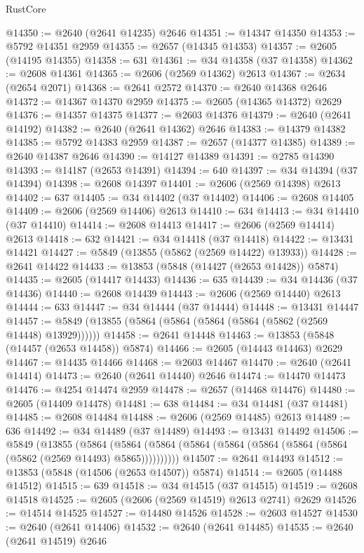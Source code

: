 \begin{lexlean}{RustCore}
\begin{coremodule}
@14350 := @2640 (@2641 @14235) @2646
@14351 := @14347 @14350
@14353 := @5792 @14351 @2959
@14355 := @2657 (@14345 @14353)
@14357 := @2605 (@14195 @14355)
@14358 := 631
@14361 := @34 @14358 (@37 @14358)
@14362 := @2608 @14361
@14365 := @2606 (@2569 @14362) @2613
@14367 := @2634 (@2654 @2071)
@14368 := @2641 @2572
@14370 := @2640 @14368 @2646
@14372 := @14367 @14370 @2959
@14375 := @2605 (@14365 @14372) @2629
@14376 := @14357 @14375
@14377 := @2603 @14376
@14379 := @2640 (@2641 @14192)
@14382 := @2640 (@2641 @14362) @2646
@14383 := @14379 @14382
@14385 := @5792 @14383 @2959
@14387 := @2657 (@14377 @14385)
@14389 := @2640 @14387 @2646
@14390 := @14127 @14389
@14391 := @2785 @14390
@14393 := @14187 (@2653 @14391)
@14394 := 640
@14397 := @34 @14394 (@37 @14394)
@14398 := @2608 @14397
@14401 := @2606 (@2569 @14398) @2613
@14402 := 637
@14405 := @34 @14402 (@37 @14402)
@14406 := @2608 @14405
@14409 := @2606 (@2569 @14406) @2613
@14410 := 634
@14413 := @34 @14410 (@37 @14410)
@14414 := @2608 @14413
@14417 := @2606 (@2569 @14414) @2613
@14418 := 632
@14421 := @34 @14418 (@37 @14418)
@14422 := @13431 @14421
@14427 := @5849 (@13855 (@5862 (@2569 @14422) @13933))
@14428 := @2641 @14422
@14433 := @13853 (@5848 (@14427 (@2653 @14428)) @5874)
@14435 := @2605 (@14417 @14433)
@14436 := 635
@14439 := @34 @14436 (@37 @14436)
@14440 := @2608 @14439
@14443 := @2606 (@2569 @14440) @2613
@14444 := 633
@14447 := @34 @14444 (@37 @14444)
@14448 := @13431 @14447
@14457 := @5849 (@13855 (@5864 (@5864 (@5864 (@5864 (@5862 (@2569 @14448) @13929))))))
@14458 := @2641 @14448
@14463 := @13853 (@5848 (@14457 (@2653 @14458)) @5874)
@14466 := @2605 (@14443 @14463) @2629
@14467 := @14435 @14466
@14468 := @2603 @14467
@14470 := @2640 (@2641 @14414)
@14473 := @2640 (@2641 @14440) @2646
@14474 := @14470 @14473
@14476 := @4254 @14474 @2959
@14478 := @2657 (@14468 @14476)
@14480 := @2605 (@14409 @14478)
@14481 := 638
@14484 := @34 @14481 (@37 @14481)
@14485 := @2608 @14484
@14488 := @2606 (@2569 @14485) @2613
@14489 := 636
@14492 := @34 @14489 (@37 @14489)
@14493 := @13431 @14492
@14506 := @5849
    (@13855
      (@5864 (@5864 (@5864 (@5864 (@5864 (@5864 (@5864 (@5864 (@5862 (@2569 @14493) @5865))))))))))
@14507 := @2641 @14493
@14512 := @13853 (@5848 (@14506 (@2653 @14507)) @5874)
@14514 := @2605 (@14488 @14512)
@14515 := 639
@14518 := @34 @14515 (@37 @14515)
@14519 := @2608 @14518
@14525 := @2605 (@2606 (@2569 @14519) @2613 @2741) @2629
@14526 := @14514 @14525
@14527 := @14480 @14526
@14528 := @2603 @14527
@14530 := @2640 (@2641 @14406)
@14532 := @2640 (@2641 @14485)
@14535 := @2640 (@2641 @14519) @2646

\end{coremodule}
\end{lexlean}

